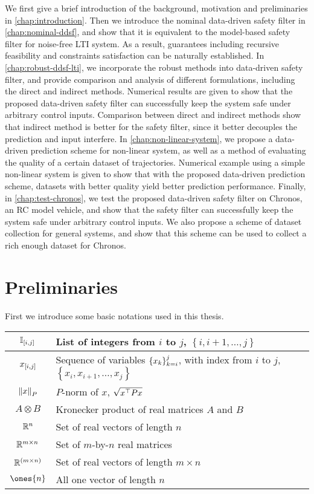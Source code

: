 We first give a brief introduction of the background, motivation and preliminaries in \cref{chap:introduction}.
Then we introduce the nominal data-driven safety filter in \cref{chap:nominal-ddsf}, and show that it is equivalent to the model-based safety filter for noise-free LTI system.
As a result, guarantees including recursive feasibility and constraints satisfaction can be naturally established.
In \cref{chap:robust-ddsf-lti}, we incorporate the robust methods into data-driven safety filter, and provide comparison and analysis of different formulations, including the direct and indirect methods.
Numerical results are given to show that the proposed data-driven safety filter can successfully keep the system safe under arbitrary control inputs.
Comparison between direct and indirect methods show that indirect method is better for the safety filter, since it better decouples the prediction and input interfere.
In \cref{chap:non-linear-system}, we propose a data-driven prediction scheme for non-linear system, as well as a method of evaluating the quality of a certain dataset of trajectories.
Numerical example using a simple non-linear system is given to show that with the proposed data-driven prediction scheme, datasets with better quality yield better prediction performance.
Finally, in \cref{chap:test-chronos}, we test the proposed data-driven safety filter on Chronos, an RC model vehicle, and show that the safety filter can successfully keep the system safe under arbitrary control inputs.
We also propose a scheme of dataset collection for general systems, and show that this scheme can be used to collect a rich enough dataset for Chronos.


\section{Preliminaries}\label{sec:preliminaries}

First we introduce some basic notations used in this thesis.

{\renewcommand{\arraystretch}{1.5}%
\begin{center}
\begin{tabular}{ c|l }
    $\mathbb{I}_{\left[ i, j \right]}$ & List of integers from $i$ to $j$, $\left\{ i, i+1, \dots, j \right\}$ \\
    \hline
    $x_{\left[ i, j \right]}$ & Sequence of variables $\left\{x_k\right\}_{k=i}^{j}$, with index from $i$ to $j$, $\left\{ x_i, x_{i+1}, \dots, x_j \right\}$ \\
    \hline
    $\norm{x}_P$ & $P$-norm of $x$, $\sqrt{x^{\top} P x}$ \\
    \hline
    $A \otimes B$ & Kronecker product of real matrices $A$ and $B$ \\
    \hline
    $\mathbb{R}^n$ & Set of real vectors of length $n$ \\
    \hline
    $\mathbb{R}^{m \times n}$ & Set of $m$-by-$n$ real matrices \\
    \hline
    $\mathbb{R}^{(m \times n)}$ & Set of real vectors of length $m \times n$ \\
    \hline
    $\ones{n}$ & All one vector of length $n$ \\
\end{tabular}
\end{center}
}

